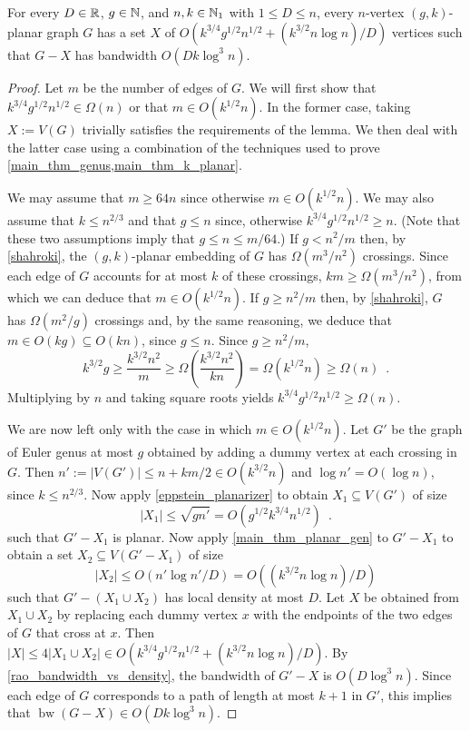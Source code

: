 \documentclass{patmorin}
\renewcommand{\ge}{\geqslant}
\renewcommand{\le}{\leqslant}
\DeclareMathOperator{\bw}{bw}
\begin{document}
\begin{thm}\label{gkPlanar}
   For every $D\in\mathbb{R}$, $g\in\mathbb{N}$, and $n,k\in\mathbb{N}_1$ with $1\le D\le n$,  every $n$-vertex $(g,k)$-planar graph $G$ has a set $X$ of $O(k^{3/4}g^{1/2}n^{1/2} + (k^{3/2}n\log n)/D)$ vertices such that $G-X$ has bandwidth $O(Dk\log^3 n)$.
\end{thm}

\begin{proof}
   Let $m$ be the number of edges of $G$. We will first show that $k^{3/4}g^{1/2}n^{1/2} \in \Omega(n)$ or that $m\in O(k^{1/2} n)$.  In the former case, taking $X:=V(G)$ trivially satisfies the requirements of the lemma.  We then deal with the latter case using a combination of the techniques used to prove \cref{main_thm_genus,main_thm_k_planar}.  
   
   We may assume that $m\ge 64n$ since otherwise $m\in O(k^{1/2}n)$.  We may also assume that $k\le n^{2/3}$ and that $g\le n$ since, otherwise $k^{3/4}g^{1/2}n^{1/2}\ge n$.  (Note that these two assumptions imply that $g\le n\le m/64$.)  If $g< n^2/m$ then, by \cref{shahroki}, the $(g,k)$-planar embedding of $G$ has $\Omega(m^3/n^2)$ crossings.  Since each edge of $G$ accounts for at most $k$ of these crossings,  $km \ge \Omega(m^3/n^2)$, from which we can deduce that $m\in O(k^{1/2} n)$.   If $g\ge n^2/m$ then, by \cref{shahroki}, $G$ has $\Omega(m^2/g)$ crossings and, by the same reasoning, we deduce that $m\in O(kg)\subseteq O(kn)$, since $g\le n$.  Since $g\ge n^2/m$,
   \[
        k^{3/2}g \ge \frac{k^{3/2}n^2}{m} \ge \Omega\left(\frac{k^{3/2}n^2}{kn}\right) = \Omega(k^{1/2}n) \ge \Omega(n) \enspace .
   \]
   Multiplying by $n$ and taking square roots yields $k^{3/4}g^{1/2}n^{1/2} \ge\Omega(n)$.  
   
   We are now left only with the case in which $m\in O(k^{1/2} n)$.   Let $G'$ be the graph of Euler genus at most $g$ obtained by adding a dummy vertex at each crossing in $G$. Then $n':=|V(G')| \le n + km/2 \in O(k^{3/2} n)$ and $\log n' = O(\log n)$, since $k\le n^{2/3}$.
Now apply \cref{eppstein_planarizer} to obtain $X_1\subseteq V(G')$ of size
\[
   |X_1| \le \sqrt{gn'} = O(g^{1/2}k^{3/4}n^{1/2}) \enspace .
\]
such that $G'-X_1$ is planar.   
Now apply \cref{main_thm_planar_gen} to $G'-X_1$ to obtain a set $X_2\subseteq V(G'-X_1)$ of size
\[
   |X_2| \le O(n'\log n'/D) = O((k^{3/2}n\log n)/D) 
\]
such that $G'-(X_1\cup X_2)$ has local density at most $D$. Let $X$ be obtained from $X_1\cup X_2$ by replacing each dummy vertex $x$ with the endpoints of the two edges of $G$ that cross at $x$. Then $|X|\le 4|X_1\cup X_2|\in O(k^{3/4}g^{1/2}n^{1/2} + (k^{3/2}n\log n)/D)$. By \cref{rao_bandwidth_vs_density}, the bandwidth of $G'-X$ is $O(D\log^3 n)$.  Since each edge of $G$ corresponds to a path of length at most $k+1$ in $G'$, this implies that $\bw(G-X)\in O(Dk\log^3 n)$. 
\end{proof}
\end{document}
